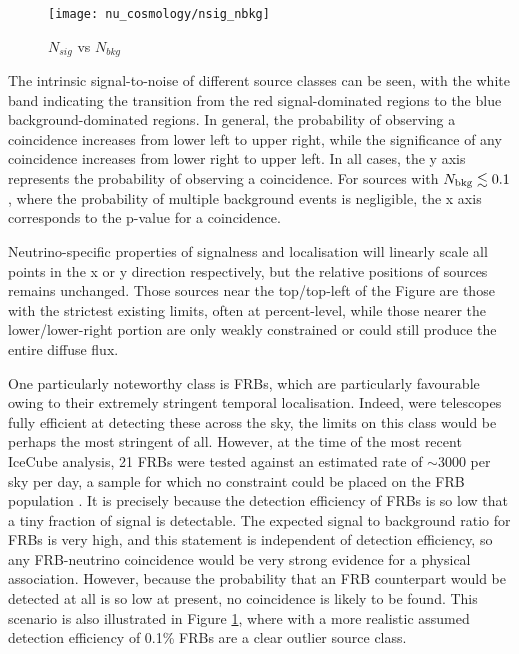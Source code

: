 \begin{figure}[!ht]
	\centering \texttt{[image: nu\_cosmology/nsig\_nbkg]}
	\caption{$N_{sig}$ vs $N_{bkg}$}
	\label{fig:nsig_nbkg}
\end{figure}

The intrinsic signal-to-noise of different source classes can be seen, with the white band indicating the transition from the red signal-dominated regions to the blue background-dominated regions. In general, the probability of observing a coincidence increases from lower left to upper right, while the significance of any coincidence increases from lower right to upper left. In all cases, the y axis represents the probability of observing a coincidence. For sources with $N_{\textup{bkg}} \lesssim 0.1$, where the probability of multiple background events is negligible, the x axis corresponds to the p-value for a coincidence. 

Neutrino-specific properties of signalness and localisation will linearly scale all points in the x or y direction respectively, but the relative positions of sources remains unchanged. Those sources near the top/top-left of the Figure are those with the strictest existing limits, often at percent-level, while those nearer the lower/lower-right portion are only weakly constrained or could still produce the entire diffuse flux. 

One particularly noteworthy class is FRBs, which are particularly favourable owing to their extremely stringent temporal localisation. Indeed, were telescopes fully efficient at detecting these across the sky, the limits on this class would be perhaps the most stringent of all. However, at the time of the most recent IceCube analysis, 21 FRBs were tested against an estimated rate of $\sim$3000 per sky per day, a sample for which no constraint could be placed on the FRB population . It is precisely because the detection efficiency of FRBs is so low that a tiny fraction of signal is detectable. The expected signal to background ratio for FRBs is very high, and this statement is independent of detection efficiency, so any FRB-neutrino coincidence would be very strong evidence for a physical association. However, because the probability that an FRB counterpart would be detected at all is so low at present, no coincidence is likely to be found. This scenario is also illustrated in Figure \ref{fig:nsig_nbkg}, where with a more realistic assumed detection efficiency of 0.1\% FRBs are a clear outlier source class.

